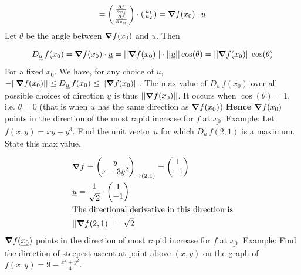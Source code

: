 \documentclass{article}
\newcommand{\n}{\leavevmode \newline} %
\newcommand{\nn}{\leavevmode \newline \newline} %
\newcommand{\Du}{D_{\underline{u}}\,} %
\numberwithin{equation}{subsection} %
\begin{document}
\begin{equation}
    =\begin{psmallmatrix}
        \pdv{f}{x_1}\\
        \pdv{f}{x_n}
    \end{psmallmatrix}
    \cdot
    \begin{psmallmatrix}
        u_1\\
        u_2
    \end{psmallmatrix}
    = \grad f(x_0)\cdot \underline{u}
\end{equation}
\n
Let $\theta$ be the angle between $\grad f(x_0)$ and $\underline{u}$. Then

\begin{equation}
    \Du f(x_0)= \grad f(x_0) \cdot \underline{u} = ||\grad f(x_0)|| \cdot ||\underline{u}||\cos(\theta) = ||\grad f(x_0)|| \cos(\theta)
\end{equation}
\n
For a fixed $x_0$. We have, for any choice of $\underline{u}$, $-||\grad f(x_0)|| \leq \Du f(x_0) \leq ||\grad f(x_0)||$. The max value of $\Du f(x_0)$ over all possible choices of direction $\underline{u}$ is thus $||\grad f(x_0)||$. It occurs when $\cos(\theta)=1$, i.e. $\theta=0$ (that is when $\underline{u}$ has the same direction as $\grad f(x_0)$)
\nn
\textbf{Hence} $\grad f(x_0)$ points in the direction of the most rapid increase for $f$ at $\underline{x_0}$.
\nn
Example: Let $f(x,y)=xy-y^3$. Find the unit vector $\underline{u}$ for which $\Du f(2,1)$ is a maximum. State this max value.

\begin{equation}
    \begin{split}
        &\grad f = \begin{pmatrix}
        y \\ x-3y^2
        \end{pmatrix}
        _{\to(2,1)} =
        \begin{pmatrix}
        1 \\ -1 
        \end{pmatrix}
        \\
        &\underline{u}=\frac{1}{\sqrt{2}} \cdot
        \begin{pmatrix}
        1 \\ -1 
        \end{pmatrix}
        \\
        &\text{The directional derivative in this direction is}
        \\
        &||\grad f(2,1)|| = \sqrt{2}
    \end{split}
\end{equation}
\n
$\grad f(\underline{x_0})$ points in the direction of most rapid increase for $f$ at $\underline{x_0}$.
\nn
Example: Find the direction of steepest ascent at point above $(x,y)$ on the graph of $f(x,y)=9-\frac{x^2+y^2}{4}$.
\end{document}
